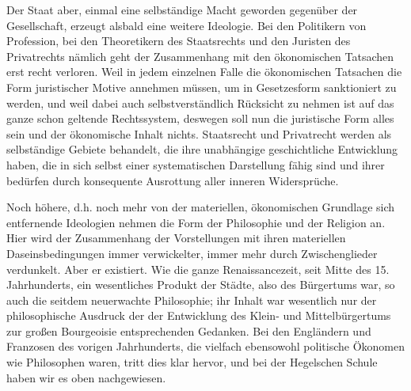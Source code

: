 Der Staat aber, einmal eine selbständige Macht geworden
gegenüber der Gesellschaft, erzeugt alsbald eine weitere Ideologie. Bei
den Politikern von Profession, bei den Theoretikern des Staatsrechts und
den Juristen des Privatrechts nämlich geht der Zusammenhang mit den
ökonomischen Tatsachen erst recht verloren. Weil in jedem einzelnen
Falle die ökonomischen Tatsachen die Form juristischer Motive annehmen
müssen, um in Gesetzesform sanktioniert zu werden, und weil dabei auch
selbstverständlich Rücksicht zu nehmen ist auf das ganze schon geltende
Rechtssystem, deswegen soll nun die juristische Form alles sein und der
ökonomische Inhalt nichts. Staatsrecht und Privatrecht werden als
selbständige Gebiete behandelt, die ihre unabhängige geschichtliche
Entwicklung haben, die in sich selbst einer systematischen Darstellung
fähig sind und ihrer bedürfen durch konsequente Ausrottung aller inneren
Widersprüche.

Noch höhere, d.h. noch mehr von der materiellen, ökonomischen
Grundlage sich entfernende Ideologien nehmen die Form der Philosophie
und der Religion an. Hier wird der Zusammenhang der Vorstellungen mit
ihren materiellen Daseinsbedingungen immer verwickelter, immer mehr
durch Zwischenglieder verdunkelt. Aber er existiert. Wie die ganze
Renaissancezeit, seit Mitte des 15. Jahrhunderts, ein wesentliches
Produkt der Städte, also des Bürgertums war, so auch die seitdem
neuerwachte Philosophie;
ihr Inhalt war wesentlich nur der
philosophische Ausdruck der der Entwicklung des Klein- und
Mittelbürgertums zur großen Bourgeoisie entsprechenden Gedanken. Bei den
Engländern und Franzosen des vorigen Jahrhunderts, die vielfach
ebensowohl politische Ökonomen wie Philosophen waren, tritt dies klar
hervor, und bei der Hegelschen Schule haben wir es oben nachgewiesen.

